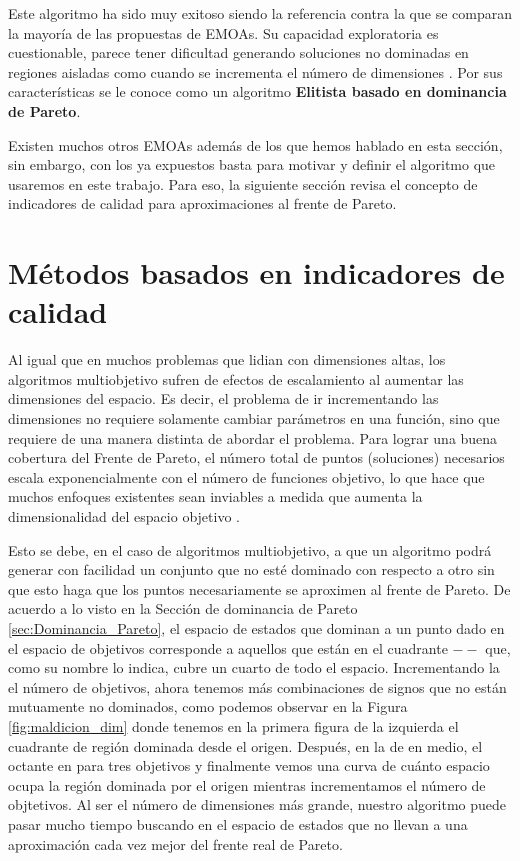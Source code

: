Este algoritmo ha sido muy exitoso siendo la referencia contra la que se comparan la mayoría de las propuestas de EMOAs. Su capacidad exploratoria es cuestionable, parece tener dificultad generando soluciones no dominadas en regiones aisladas como cuando se incrementa el número de dimensiones \cite{coelloEvolutionaryAlgorithmsSolving}. Por sus características se le conoce como un algoritmo \textbf{Elitista basado en dominancia de Pareto}.

Existen muchos otros EMOAs además de los que hemos hablado en esta sección, sin embargo, con los ya expuestos basta para motivar y definir el algoritmo que usaremos en este trabajo. Para eso, la siguiente sección revisa el concepto de indicadores de calidad para aproximaciones al frente de Pareto. 

\section{Métodos basados en indicadores de calidad} \label{sec:Metodos_QI}

Al igual que en muchos problemas que lidian con dimensiones altas, los algoritmos multiobjetivo sufren de efectos de escalamiento al aumentar las dimensiones del espacio. Es decir, el problema de ir incrementando las dimensiones no requiere solamente cambiar parámetros en una función, sino que requiere de una manera distinta de abordar el problema.
Para lograr una buena cobertura del Frente de Pareto, el número total de puntos (soluciones) necesarios escala exponencialmente con el número de funciones objetivo, lo que hace que muchos enfoques existentes sean inviables a medida que aumenta la dimensionalidad del espacio objetivo \cite{tanParetoOptimizationSmall2023}. 

Esto se debe, en el caso de algoritmos multiobjetivo, a que un algoritmo podrá generar con facilidad un conjunto que no esté dominado con respecto a otro sin que esto haga que los puntos necesariamente se aproximen al frente de Pareto. De acuerdo a lo visto en la Sección de dominancia de Pareto \ref{sec:Dominancia_Pareto}, el espacio de estados que dominan a un punto dado en el espacio de objetivos corresponde a aquellos que están en el cuadrante $--$ que, como su nombre lo indica, cubre un cuarto de todo el espacio. Incrementando la el número de objetivos, ahora tenemos más combinaciones de signos que no están mutuamente no dominados, como podemos observar en la Figura \ref{fig:maldicion_dim} donde tenemos en la primera figura de la izquierda el cuadrante de región dominada desde el origen. Después, en la de en medio, el octante en para tres objetivos y finalmente vemos una curva de cuánto espacio ocupa la región dominada por el origen mientras incrementamos el número de objtetivos. Al ser el número de dimensiones más grande, nuestro algoritmo puede pasar mucho tiempo buscando en el espacio de estados que no llevan a una aproximación cada vez mejor del frente real de Pareto. 

